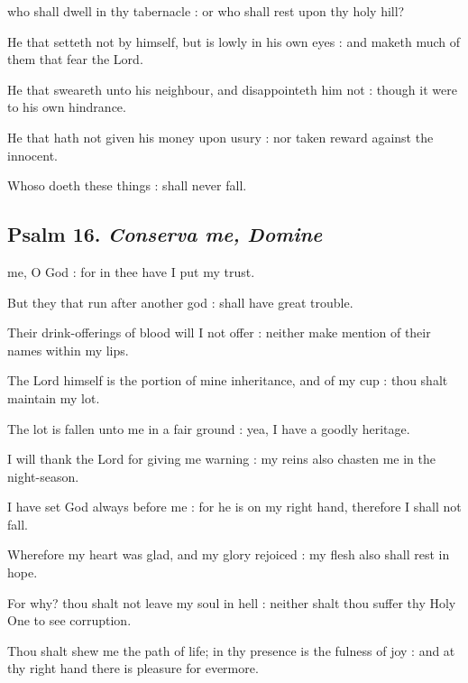  who shall dwell in thy tabernacle : or who shall rest upon thy holy hill?\par
{}
He that setteth not by himself, but is lowly in his own eyes : and maketh much of them that fear the Lord.\par
{}He that sweareth unto his neighbour, and disappointeth him not : though it were to his own hindrance.\par
{}He that hath not given his money upon usury : nor taken reward against the innocent.\par
{}Whoso doeth these things : shall never fall.\par

\vspace{-0.25\baselineskip}

\subsection{Psalm 16. \textit{Conserva me, Domine}}

 me, O God : for in thee have I put my trust.\par
{}
But they that run after another god : shall have great trouble.\par
{}Their drink-offerings of blood will I not offer : neither make mention of their names within my lips.\par
{}The Lord himself is the portion of mine inheritance, and of my cup : thou shalt maintain my lot.\par
{}The lot is fallen unto me in a fair ground : yea, I have a goodly heritage.\par
{}I will thank the Lord for giving me warning : my reins also chasten me in the night-season.\par
{}I have set God always before me : for he is on my right hand, therefore I shall not fall.\par
{}Wherefore my heart was glad, and my glory rejoiced : my flesh also shall rest in hope.\par
{}For why? thou shalt not leave my soul in hell : neither shalt thou suffer thy Holy One to see corruption.\par
{}Thou shalt shew me the path of life; in thy presence is the fulness of joy : and at thy right hand there is pleasure for evermore.\par

